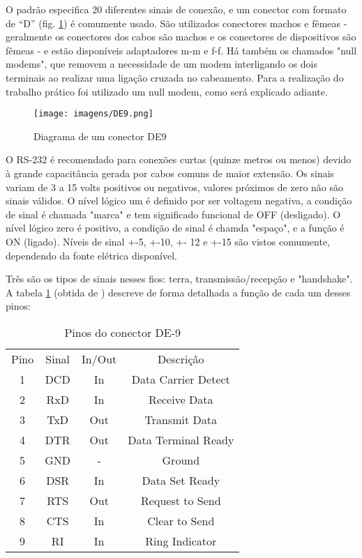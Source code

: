 \documentclass[brazil,times,12pt]{abnt}
\begin{document}
	O padrão especifica 20 diferentes sinais de conexão, e um conector com formato
	de ``D'' (fig. \ref{fig:de9}) é comumente usado. São utilizados conectores
	machos e fêmeas - geralmente os conectores dos cabos são machos e os
	conectores de dispositivos são fêmeas - e estão disponíveis adaptadores m-m e
	f-f. Há também os chamados "null modems", que removem a necessidade de um modem
	interligando os dois terminais ao realizar uma ligação cruzada no cabeamento.
	Para a realização do trabalho prático foi utilizado um null modem, como será
	explicado adiante.
	
	\begin{figure}[htp]
	\begin{center}
		\texttt{[image: imagens/DE9.png]}
		\caption[Diagrama de um conector DE9]{Diagrama de um conector DE9}
		\label{fig:de9}
	\end{center}
	\end{figure}
	
	O RS-232 é recomendado para conexões curtas (quinze metros ou menos) devido à
	grande capacitância gerada por cabos comuns de maior extensão. Os sinais variam
	de 3 a 15 volts positivos ou negativos, valores próximos de zero não são
	sinais válidos. O nível lógico um é definido por ser voltagem negativa, a
	condição de sinal é chamada "marca" e tem significado funcional de OFF
	(desligado). O nível lógico zero é positivo, a condição de sinal é chamda
	"espaço", e a função é ON (ligado). Níveis de sinal +-5, +-10, +- 12 e +-15
	são vistos comumente, dependendo da fonte elétrica
	disponível.\cite{strangio:rs232-standard}
	
	Três são os tipos de sinais nesses fios: terra, transmissão/recepção e
	"handshake". A tabela \ref{tab:de9} (obtida de \cite{anton:rs232-pinout})
	descreve de forma detalhada a função de cada um desses pinos:

	\begin{table}[h]
	\begin{center}
	\begin{tabular}{|c|c|c|c|}
		Pino & Sinal & In/Out & Descrição \\
		1 & DCD & In  & Data Carrier Detect \\
		2 & RxD & In  & Receive Data \\
		3 & TxD & Out & Transmit Data \\
		4 & DTR & Out & Data Terminal Ready \\
		5 & GND &  -  & Ground \\
		6 & DSR & In  & Data Set Ready \\
		7 & RTS & Out & Request to Send \\
		8 & CTS & In  & Clear to Send \\
		9 & RI  & In  & Ring Indicator
	\end{tabular}
	\end{center}
	\caption{Pinos do conector DE-9}
	\label{tab:de9}
	\end{table}
	
\end{document}
